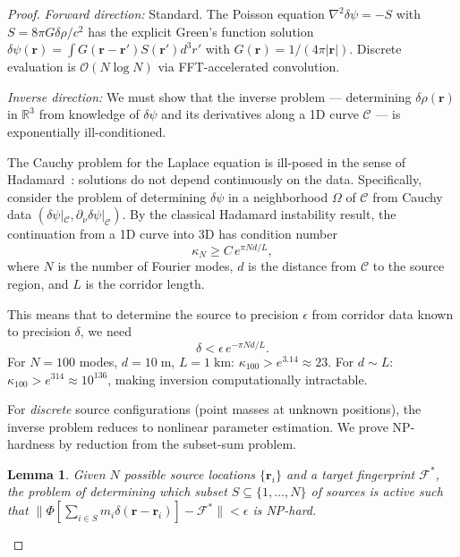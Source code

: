 \documentclass[twocolumn,superscriptaddress,prd,nofootinbib]{revtex4-2}
\newcommand{\order}[1]{\mathcal{O}(#1)}
\newcommand{\Corridor}{\mathcal{C}}
\newcommand{\Fingerprint}{\mathcal{F}}
\newtheorem{lemma}[theorem]{Lemma}
\begin{document}
\begin{proof}
\emph{Forward direction:} Standard. The Poisson equation
$\nabla^2\delta\psi = -S$ with $S = 8\pi G\delta\rho/c^2$ has the
explicit Green's function solution
$\delta\psi(\mathbf{r}) = \int G(\mathbf{r}-\mathbf{r}')S(\mathbf{r}')d^3r'$
with $G(\mathbf{r}) = 1/(4\pi|\mathbf{r}|)$. Discrete evaluation is
$\order{N\log N}$ via FFT-accelerated convolution.

\emph{Inverse direction:} We must show that the inverse problem ---
determining $\delta\rho(\mathbf{r})$ in $\mathbb{R}^3$ from knowledge
of $\delta\psi$ and its derivatives along a 1D curve $\Corridor$ --- is
exponentially ill-conditioned.

The Cauchy problem for the Laplace equation is ill-posed in the sense of
Hadamard~\cite{Hadamard1923}: solutions do not depend continuously on
the data. Specifically, consider the problem of determining
$\delta\psi$ in a neighborhood $\Omega$ of $\Corridor$ from Cauchy data
$(\delta\psi|_\Corridor, \partial_\nu\delta\psi|_\Corridor)$.
By the classical Hadamard instability result, the continuation from a
1D curve into 3D has condition number
\begin{equation}
\kappa_N \geq C\,e^{\pi N d/L},
\label{eq:hadamard}
\end{equation}
where $N$ is the number of Fourier modes, $d$ is the distance from
$\Corridor$ to the source region, and $L$ is the corridor length.

This means that to determine the source to precision $\epsilon$ from
corridor data known to precision $\delta$, we need
\begin{equation}
\delta < \epsilon\,e^{-\pi N d/L}.
\end{equation}
For $N = 100$ modes, $d = 10\;\text{m}$, $L = 1\;\text{km}$:
$\kappa_{100} > e^{3.14} \approx 23$. For $d \sim L$:
$\kappa_{100} > e^{314} \approx 10^{136}$, making inversion
computationally intractable.

For \emph{discrete} source configurations (point masses at unknown
positions), the inverse problem reduces to nonlinear parameter estimation.
We prove NP-hardness by reduction from the subset-sum problem.

\begin{lemma}\label{lem:np-hard}
Given $N$ possible source locations $\{\mathbf{r}_i\}$ and a target
fingerprint $\Fingerprint^*$, the problem of determining which subset
$S \subseteq \{1,\ldots,N\}$ of sources is active such that
$\|\Phi[\sum_{i\in S} m_i\delta(\mathbf{r}-\mathbf{r}_i)] -
\Fingerprint^*\| < \epsilon$ is NP-hard.
\end{lemma}


\end{proof}
\end{document}
